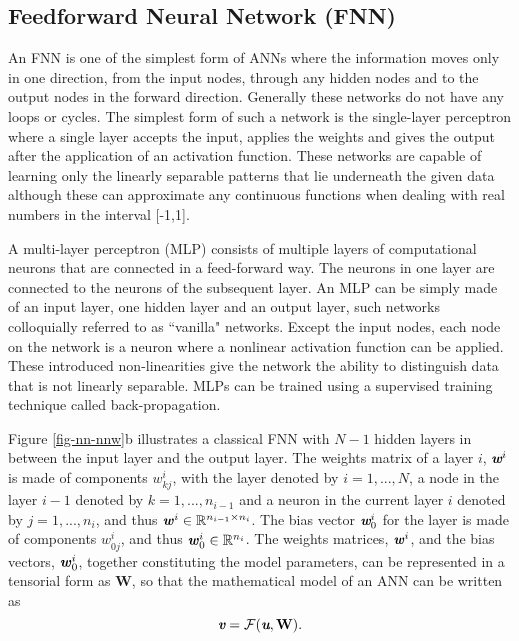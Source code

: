 \subsection{Feedforward Neural Network (FNN)}\label{nn-ann-stru}
An FNN is one of the simplest form of ANNs where the information moves only in one direction, from the input nodes, through any hidden nodes and to the output nodes in the forward direction. Generally these networks do not have any loops or cycles. The simplest form of such a network is the single-layer perceptron where a single layer accepts the input, applies the weights and gives the output after the application of an activation function\cite{kellerFiniteAutomataPattern1961}. These networks are capable of learning only the linearly separable patterns that lie underneath the given data although these can approximate any continuous functions when dealing with real numbers in the interval [-1,1]\cite{auerLearningRuleVery2008}.

A multi-layer perceptron (MLP) consists of multiple layers of computational neurons that are connected in a feed-forward way. The neurons in one layer are connected to the neurons of the subsequent layer\cite{hastieElementsStatisticalLearning2009}. An MLP can be simply made of an input layer, one hidden layer and an output layer, such networks colloquially referred to as ``vanilla" networks. Except the input nodes, each node on the network is a neuron where a nonlinear activation function can be applied. These introduced non-linearities give the network the ability to distinguish data that is not linearly separable. MLPs can be trained using a supervised training technique called back-propagation.

Figure \ref{fig-nn-nnw}b illustrates a classical FNN with $ N-1 $ hidden layers in between the input layer and the output layer. The weights matrix of a layer $ i $, $ \textit{\textbf{w}}^i $ is made of components $ w^i_{kj} $, with the layer denoted by $ i=1,...,N $, a node in the layer $ i-1 $ denoted by $ k=1,...,n_{i-1} $ and a neuron in the current layer $ i $ denoted by $ j=1,...,n_i $, and thus $ \textbf{\textit{w}}^i\in\mathbb{R}^{n_{i-1}\times n_i} $. The bias vector $ \textit{\textbf{w}}^i_0 $ for the layer is made of components $ w^i_{0j} $, and thus $ \textbf{\textit{w}}^i_0\in\mathbb{R}^{n_i} $. The weights matrices, $ \textbf{\textit{w}}^i $, and the bias vectors, $ \textbf{\textit{w}}^i_0 $, together constituting the model parameters, can be represented in a tensorial form as $ \textbf{W} $, so that the mathematical model of an ANN can be written as 
\begin{equation}\label{eq-nn-nnw}
\textit{\textbf{v}}=\mathcal{F}(\textit{\textbf{u}},\textbf{W}).
\end{equation} 

